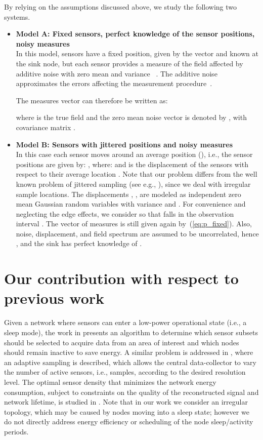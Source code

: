 \documentclass[final, a4paper]{IEEEtran}
\begin{document}
By relying on the assumptions discussed above, we study the following two systems.
\begin{itemize}
\item  {\bf Model A: Fixed sensors, perfect knowledge of the sensor positions, noisy measures}\\
In this model, sensors have a fixed position, given by the vector
 and known at the sink node, but each sensor provides a measure
of the field affected by additive noise with zero mean and variance
~\cite{Vuran04}.
The additive noise approximates the errors affecting the measurement procedure~\cite{Ergen06}.


The measures vector can therefore be written as:

where  is the true field and the zero mean noise vector is denoted by
, with covariance matrix .


\item {\bf Model B: Sensors with jittered positions and noisy measures}\\
In this case each sensor moves around an average position
 (), i.e., the sensor positions are given
by: , where:  and  is
the displacement of the sensors with respect to their average
location .  Note that our problem differs from
the well known problem of jittered sampling (see e.g.,
\cite{LiuStanley}), since we deal with irregular sample locations.
The displacements , , are modeled as
independent zero mean Gaussian random variables with variance
 and .  For convenience and
neglecting the edge effects, we consider  so that 
falls in the observation interval . The vector  of
measures is still given again by~(\ref{eq:p_fixed}). Also,  noise,
displacement, and field spectrum are assumed to be 
uncorrelated, hence , and the sink has perfect knowledge
of .
\end{itemize}

\section{Our contribution with respect to previous work}
\label{sec:related-work}

Given a network where sensors can enter a low-power operational
state (i.e., a sleep mode), the work in \cite{Perillo04}  presents an algorithm to determine which
sensor subsets should be selected to acquire data from an
area of interest and which nodes should remain inactive to
save energy.
A similar problem is addressed in \cite{Willett04}, where an adaptive sampling is
described, which
allows the central data-collector to vary the number of active
sensors, i.e., samples, according to the desired resolution level.
The optimal sensor density that minimizes the network energy consumption,
subject to constraints on the quality of the reconstructed signal and
network lifetime, is studied in \cite{Maleki05}.
Note that in our work we consider an irregular topology, which may be
caused by nodes moving into a sleep state; however we do not directly
address energy efficiency or scheduling of the node sleep/activity
periods.
\end{document}
